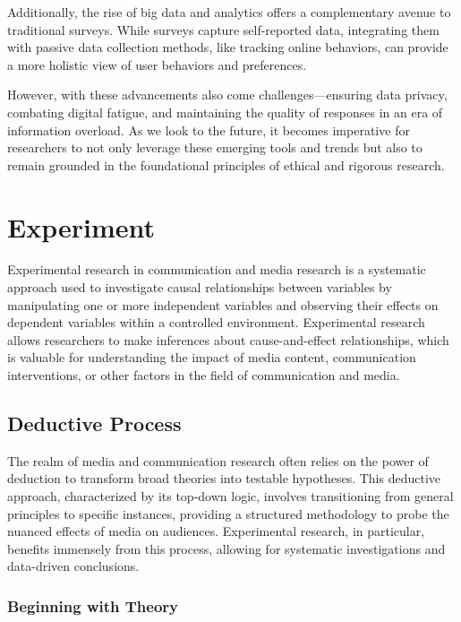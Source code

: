 \documentclass[
  b5paper]{book}
\begin{document}
Additionally, the rise of big data and analytics offers a complementary avenue to traditional surveys. While surveys capture self-reported data, integrating them with passive data collection methods, like tracking online behaviors, can provide a more holistic view of user behaviors and preferences.

However, with these advancements also come challenges---ensuring data privacy, combating digital fatigue, and maintaining the quality of responses in an era of information overload. As we look to the future, it becomes imperative for researchers to not only leverage these emerging tools and trends but also to remain grounded in the foundational principles of ethical and rigorous research.

\hypertarget{experiment-1}{%
\chapter{Experiment}\label{experiment-1}}

Experimental research in communication and media research is a systematic approach used to investigate causal relationships between variables by manipulating one or more independent variables and observing their effects on dependent variables within a controlled environment. Experimental research allows researchers to make inferences about cause-and-effect relationships, which is valuable for understanding the impact of media content, communication interventions, or other factors in the field of communication and media.

\hypertarget{deductive-process}{%
\section{Deductive Process}\label{deductive-process}}

The realm of media and communication research often relies on the power of deduction to transform broad theories into testable hypotheses. This deductive approach, characterized by its top-down logic, involves transitioning from general principles to specific instances, providing a structured methodology to probe the nuanced effects of media on audiences. Experimental research, in particular, benefits immensely from this process, allowing for systematic investigations and data-driven conclusions.

\hypertarget{beginning-with-theory}{%
\subsection*{Beginning with Theory}\label{beginning-with-theory}}
\end{document}
